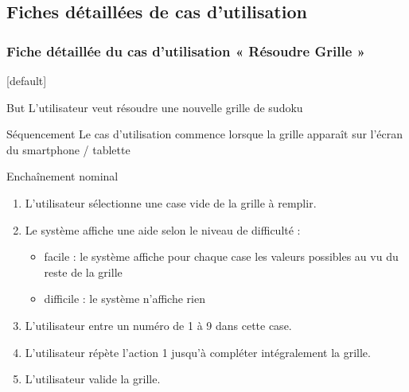 \documentclass{beamer}
\begin{document}
\subsection{Fiches détaillées de cas d’utilisation}
\begin{frame}
  \frametitle{Fiche détaillée du cas d'utilisation « Résoudre Grille »}
  [default]
  \begin{block}{\footnotesize{But}}
    \scriptsize{L'utilisateur veut résoudre une nouvelle grille de sudoku}
  \end{block}
  \pause
  \begin{block}{\footnotesize{Séquencement}}
    \scriptsize{Le cas d'utilisation commence lorsque la grille apparaît sur l'écran du smartphone / tablette}
  \end{block}
  \pause
  \begin{block}{\footnotesize{Enchaînement nominal}}
    \begin{enumerate}    
      [circle]
      \item
        \scriptsize{L'utilisateur sélectionne une case vide de la grille à remplir.}
      \item
        \scriptsize{Le système affiche une aide selon le niveau de difficulté :}
        \begin{itemize}
          [circle]
          \item
            \scriptsize{facile : le système affiche pour chaque case les valeurs possibles au vu du reste de la grille}
          \item
            \scriptsize{difficile : le système n'affiche rien}
        \end{itemize}
      \item
        \scriptsize{L'utilisateur entre un numéro de 1 à 9 dans cette case.}
      \item
        \scriptsize{L'utilisateur répète l'action 1 jusqu'à compléter intégralement la grille.}
      \item
        \scriptsize{L'utilisateur valide la grille.}
    \end{enumerate}
  \end{block}
\end{frame}
\end{document}
